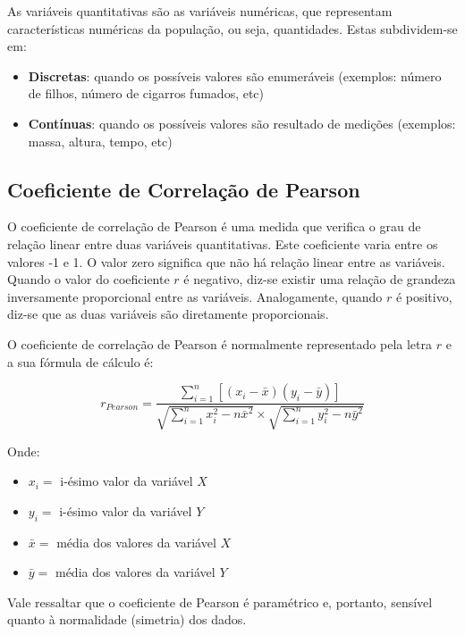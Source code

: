 \documentclass[
]{estat/estat}
\providecommand{\tightlist}{%
  \setlength{\itemsep}{0pt}\setlength{\parskip}{0pt}}\usepackage{longtable,booktabs,array}
\begin{document}
As variáveis quantitativas são as variáveis numéricas, que representam
características numéricas da população, ou seja, quantidades. Estas
subdividem-se em:

\begin{itemize}
\tightlist
\item
  \textbf{Discretas}: quando os possíveis valores são enumeráveis
  (exemplos: número de filhos, número de cigarros fumados, etc)
\item
  \textbf{Contínuas}: quando os possíveis valores são resultado de
  medições (exemplos: massa, altura, tempo, etc)
\end{itemize}

\hypertarget{coeficiente-de-correlauxe7uxe3o-de-pearson}{%
\subsection{Coeficiente de Correlação de
Pearson}\label{coeficiente-de-correlauxe7uxe3o-de-pearson}}

O coeficiente de correlação de Pearson é uma medida que verifica o grau
de relação linear entre duas variáveis quantitativas. Este coeficiente
varia entre os valores -1 e 1. O valor zero significa que não há relação
linear entre as variáveis. Quando o valor do coeficiente \(r\) é
negativo, diz-se existir uma relação de grandeza inversamente
proporcional entre as variáveis. Analogamente, quando \(r\) é positivo,
diz-se que as duas variáveis são diretamente proporcionais.

O coeficiente de correlação de Pearson é normalmente representado pela
letra \(r\) e a sua fórmula de cálculo é:

\[
r_{Pearson} = \frac{\displaystyle \sum_{i=1}^{n} \left [ \left(x_i-\bar{x}\right) \left(y_i-\bar{y}\right) \right]}{\sqrt{\displaystyle \sum_{i=1}^{n} x_i^2 - n\bar{x}^2}  \times \sqrt{\displaystyle \sum_{i=1}^{n} y_i^2 - n\bar{y}^2}}
\]

Onde:

\begin{itemize}
\tightlist
\item
  \(x_i =\) i-ésimo valor da variável \(X\)
\item
  \(y_i =\) i-ésimo valor da variável \(Y\)
\item
  \(\bar{x} =\) média dos valores da variável \(X\)
\item
  \(\bar{y} =\) média dos valores da variável \(Y\)
\end{itemize}

Vale ressaltar que o coeficiente de Pearson é paramétrico e, portanto,
sensível quanto à normalidade (simetria) dos dados.
\end{document}
